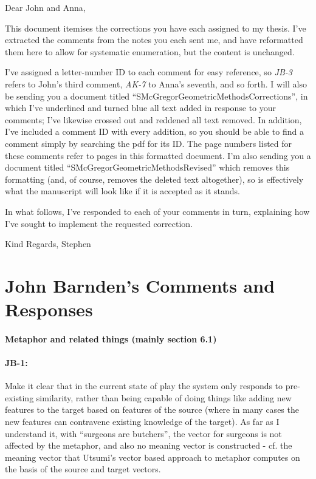 \documentclass[11pt,a4paper]{article}
\begin{document}
Dear John and Anna,

This document itemises the corrections you have each assigned to my thesis.  I've extracted the comments from the notes you each sent me, and have reformatted them here to allow for systematic enumeration, but the content is unchanged.

I've assigned a letter-number ID to each comment for easy reference, so \emph{JB-3} refers to John's third comment, \emph{AK-7} to Anna's seventh, and so forth.  I will also be sending you a document titled ``SMcGregorGeometricMethodsCorrections'', in which I've underlined and turned blue all text added in response to your comments; I've likewise crossed out and reddened all text removed.  In addition, I've included a comment ID with every addition, so you should be able to find a comment simply by searching the pdf for its ID.  The page numbers listed for these comments refer to pages in this formatted document.  I'm also sending you a document titled ``SMcGregorGeometricMethodsRevised'' which removes this formatting (and, of course, removes the deleted text altogether), so is effectively what the manuscript will look like if it is accepted as it stands.

In what follows, I've responded to each of your comments in turn, explaining how I've sought to implement the requested correction.

Kind Regards,
Stephen

\section{John Barnden's Comments and Responses}

\paragraph{Metaphor and related things  (mainly section 6.1)}

\paragraph{JB-1:} Make it clear that in the current state of play the system only responds to pre-existing similarity, rather than being capable of doing things like adding new features to the target based on features of the source (where in many cases the new features can contravene existing knowledge of the target).  As far as I understand it, with ``surgeons are butchers'', the vector for surgeons is not affected by the metaphor, and also no meaning vector is constructed - cf. the meaning vector that Utsumi's vector based approach to metaphor computes on the basis of the source and target vectors.
\end{document}
